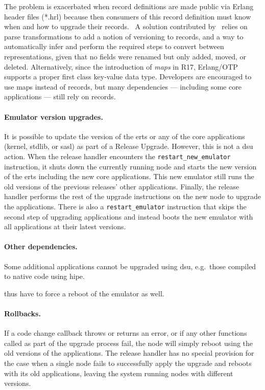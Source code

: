 The problem is exacerbated when record definitions are made public via Erlang header files (*.hrl) because then consumers of this record definition must know when and how to upgrade their records.~\cite{davis:talk} A solution contributed by~\cite{wiger:parsetrans} relies on parse transformations to add a notion of versioning to records, and a way to automatically infer and perform the required steps to convert between representations, given that no fields were renamed but only added, moved, or deleted. Alternatively, since the introduction of \emph{maps} in R17, Erlang/OTP supports a proper first class key-value data type. Developers are encouraged to use maps instead of records, but many dependencies –– including some core applications –– still rely on records.

\paragraph{Emulator version upgrades.} It is possible to update the version of the \acrfull{erts} or any of the core applications (kernel, stdlib, or sasl) as part of a Release Upgrade. However, this is not a \acrshort{dsu} action. When the release handler encounters the \lstinline|restart_new_emulator| instruction, it shuts down the currently running node and starts the new version of the \acrshort{erts} including the new core applications. This new emulator still runs the old versions of the previous releases' other applications. Finally, the release handler performs the rest of the upgrade instructions on the new node to upgrade the applications. There is also a \lstinline|restart_emulator| instruction that skips the second step of upgrading applications and instead boots the new emulator with all applications at their latest versions.

\paragraph{Other dependencies.}
Some additional applications cannot be upgraded using \acrshort{dsu}, e.g.~those compiled to native code using \acrshort{hipe}.

thus have to force a reboot of the emulator as well.



\paragraph{Rollbacks.} If a code change callback throws or returns an error, or if any other functions called as part of the upgrade process fail, the node will simply reboot using the old versions of the applications. The release handler has no special provision for the case when a single node fails to successfully apply the upgrade and reboots with its old applications, leaving the system running nodes with different versions.

